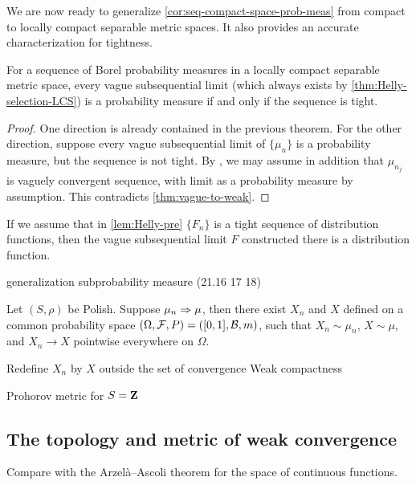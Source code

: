 We are now ready to generalize \cref{cor:seq-compact-space-prob-meas} from compact to locally compact separable metric spaces. It also provides an accurate characterization for tightness.
\begin{prop} \label{prop:tightness-characterization}
    For a sequence of Borel probability measures in a locally compact separable metric space, every vague subsequential limit (which always exists by \cref{thm:Helly-selection-LCS}) is a probability measure if and only if the sequence is tight.
\end{prop}
\begin{proof}
    One direction is already contained in the previous theorem. For the other direction, suppose every vague subsequential limit of $\{\mu_n\}$ is a probability measure, but the sequence is not tight. By , we may assume in addition that $\mu_{n_j}$ is vaguely convergent sequence, with limit as a probability measure by assumption. This contradicts \cref{thm:vague-to-weak}.
\end{proof}

\begin{namedthm}
    If we assume that in \cref{lem:Helly-pre} $\{F_n\}$ is a tight sequence of distribution functions, then the vague subsequential limit $F$ constructed there is a distribution function.
\end{namedthm}

generalization subprobability measure (21.16 17 18)

\begin{namedthm}
    Let $(S,\rho)$ be Polish. Suppose $\mu_n \Rightarrow \mu$, then there exist $X_n$ and $X$ defined on a common probability space $(\Omega,\mathcal{F},P) = ([0,1],\mathcal{B},m)$, such that $X_n \sim \mu_n$, $X\sim \mu$, and $X_n \to X$ pointwise everywhere on $\Omega$.
\end{namedthm}

Redefine $X_n$ by $X$ outside the set of convergence
Weak compactness

Prohorov metric for $S = \mathbf{Z}$

\subsection{The topology and metric of weak convergence}

Compare with the Arzelà--Ascoli theorem for the space of continuous functions.

